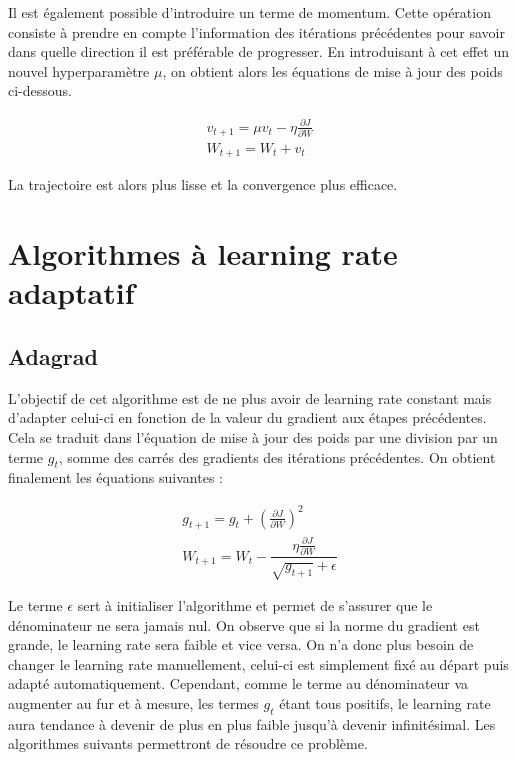 Il est également possible d'introduire un terme de momentum. Cette opération consiste à prendre en compte l'information des itérations précédentes pour savoir dans quelle direction il est préférable de progresser. En introduisant à cet effet un nouvel hyperparamètre $\mu$, on obtient alors les équations de mise à jour des poids ci-dessous.

\begin{equation}
\begin{aligned}
v_{t+1} = \mu v_t - \eta\frac{\partial J}{\partial W}\\
W_{t+1} = W_t + v_t
\end{aligned}
\end{equation} 

La trajectoire est alors plus lisse et la convergence plus efficace.

\section{Algorithmes à learning rate adaptatif}
\subsection{Adagrad}

L'objectif de cet algorithme est de ne plus avoir de learning rate constant mais d'adapter celui-ci en fonction de la valeur du gradient aux étapes précédentes. Cela se traduit dans l'équation de mise à jour des poids par une division par un terme $g_t$, somme des carrés des gradients des itérations précédentes.
On obtient finalement les équations suivantes :

\begin{equation}
\begin{aligned}
g_{t+1} = g_t + (\frac{\partial J}{\partial W})^2 \\
W_{t+1} = W_t - \dfrac{\eta\frac{\partial J}{\partial W}}{\sqrt{g_{t+1}} + \epsilon}
\end{aligned}
\end{equation} 

Le terme $\epsilon$ sert à initialiser l'algorithme et permet de s'assurer que le dénominateur ne sera jamais nul. On observe que si la norme du gradient est grande, le learning rate sera faible et vice versa. 
On n'a donc plus besoin de changer le learning rate manuellement, celui-ci est simplement fixé au départ puis adapté automatiquement. Cependant, comme le terme au dénominateur va augmenter au fur et à mesure, les termes $g_t$ étant tous positifs, le learning rate aura tendance à devenir de plus en plus faible jusqu'à devenir infinitésimal. Les algorithmes suivants permettront de résoudre ce problème.

